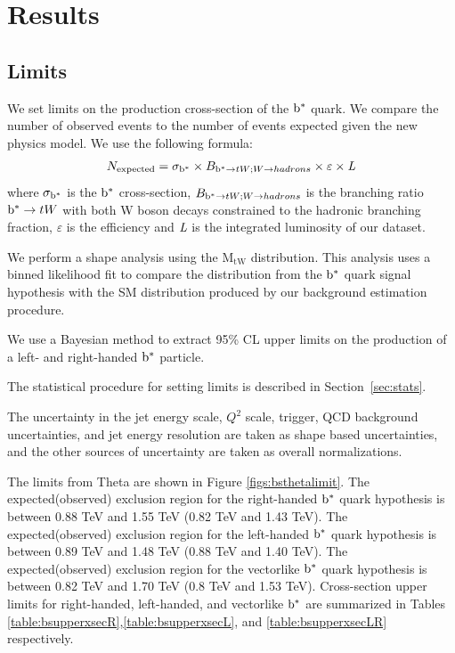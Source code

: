 \clearpage
\newpage
\section{Results}
\subsection{Limits}
\label{sec:bsstats}
We set limits on the production cross-section of 
the $\mathrm{b}^{*}$ quark. We compare the number 
of observed events to the number of events expected given the new physics model. We use the following formula:
\begin{eqnarray}
N_{\textrm{expected}} = \sigma_{\mathrm{b}^{*}} \times B_{\mathrm{b}^{*} \rightarrow tW;W \to hadrons} \times \varepsilon \times \emph{L}
\end{eqnarray}
where $\sigma_{\mathrm{b}^{*}}$ is the $\mathrm{b}^{*}$ cross-section, $B_{\mathrm{b}^{*} \rightarrow tW;W \to hadrons}$ is the branching ratio 
$\mathrm{b}^{*} \to tW$ with both W boson decays constrained to the hadronic branching fraction, $\varepsilon$ is the efficiency and $\emph{L}$ is the integrated luminosity of our dataset. 

We perform a shape analysis using the $\mathrm{M_{tW}}$ distribution.  This analysis uses a binned likelihood fit to compare the distribution from the $\mathrm{b}^{*}$ quark signal 
hypothesis with the SM distribution produced by our background estimation procedure.  

\label{sec:bsTheta}
We use a Bayesian method to extract 95\% CL upper limits 
on the production of a left- and right-handed $\mathrm{b}^{*}$ particle.  

The statistical procedure for setting limits is described in Section~\ref{sec:stats}. 

The uncertainty in the jet energy scale, $Q^2$ scale, trigger, QCD background uncertainties, and jet energy resolution are taken 
as shape based uncertainties, and the other sources of uncertainty are taken as overall normalizations.  

The limits from Theta are shown in Figure \ref{figs:bsthetalimit}.  
The expected(observed) exclusion region for the right-handed $\mathrm{b}^{*}$ quark hypothesis is between 0.88 TeV and 1.55 TeV (0.82 TeV and 1.43 TeV).  
The expected(observed) exclusion region for the left-handed $\mathrm{b}^{*}$ quark hypothesis is between 0.89 TeV and 1.48 TeV (0.88 TeV and 1.40 TeV).  
The expected(observed) exclusion region for the vectorlike $\mathrm{b}^{*}$ quark hypothesis is between 0.82 TeV and 1.70 TeV (0.8 TeV and 1.53 TeV).  Cross-section upper limits for 
right-handed, left-handed, and vectorlike $\mathrm{b}^{*}$ are summarized in Tables \ref{table:bsupperxsecR},\ref{table:bsupperxsecL}, and \ref{table:bsupperxsecLR} respectively. 

